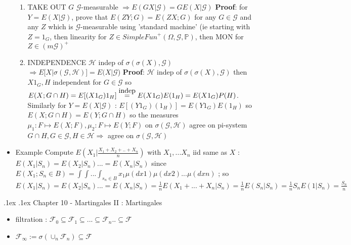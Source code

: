 \documentclass[10pt,landscape,a4paper]{article}
\makeatletter
\renewcommand{\section}{\@startsection{section}{1}{0mm}%
                                {.1ex}%
                                {.1ex}%
                                {\color{blue}\sffamily\small\bfseries}}
\newcommand\myeq[1]{\stackrel{{\normalfont\mbox{#1}}}{ = }}
\makeatother
\begin{document}
\begin{multicols*}{3}
\begin{spacing}{0.5}
\begin{itemize}
\begin{enumerate}
\item \colorbox{green!10}{TAKE OUT $G$ $\mathcal{G}$-measurable $\Rightarrow E(GX|\mathcal{G})=GE(X|\mathcal{G})$} \textbf{Proof}: for $Y=E(X|\mathcal{G})$, prove that $E(ZY;G)=E(ZX;G)$ for any $G \in \mathcal{G}$ and any $Z$ which is $\mathcal{G}$-measurable using 'standard machine' (ie starting with $Z={1}_G$, then linearity  for $Z \in {SimpleFun}^+(\Omega,\mathcal{G},\mathbb{P})$, then MON for $Z \in {(m\mathcal{G})}^+ $
	
\item \colorbox{green!10}{INDEPENDENCE $ \mathcal{H}$ indep of $\sigma(\sigma(X),\mathcal{G})$} \\ \colorbox{green!10}{ $\Rightarrow E[X|\sigma(\mathcal{G},\mathcal{H})]=E(X|\mathcal{G}$) } \textbf{Proof}: $ \mathcal{H}$ indep of $\sigma(\sigma(X),\mathcal{G})$ then $X1_G,H$ independent for $G \in \mathcal{G}$ so $E(X;G \cap H)=E[(X1_G)1_H] \myeq{indep} E(X1_G)E(1_H)=E(X1_G)P(H)$. Similarly for $Y=E(X|\mathcal{G})$ : $E[(Y1_G)(1_H)]=E(Y1_G)E(1_H)$ so $E(X;G \cap H)=E(Y;G \cap H)$ so the measures $\mu_1: F \mapsto E(X;F), \mu_2: F \mapsto E(Y;F)$ on $\sigma(\mathcal{G},\mathcal{H})$ agree on pi-system $G \cap H, G\in \mathcal{G}, H \in \mathcal{H} \Rightarrow$ agree  on $\sigma(\mathcal{G},\mathcal{H})$

\end{enumerate}

\item \colorbox{green!10}{Example} Compute $E(X_1| \frac{X_1+X_2+..+X_n}{n})$ with $X_1,...X_n$ iid same as $X$ : $E(X_1|S_n)=E(X_2|S_n)...=E(X_n|S_n)$ since $E(X_1;S_n \in B)=\int \int ... \int_{s_n \in B} x_1 \mu(dx1)\mu(dx2)...\mu(dxn)$ ; so $E(X_1|S_n)=E(X_2|S_n)...=E(X_n|S_n) = \frac{1}{n} E(X_1+...+X_n|S_n)=\frac{1}{n} E(S_n|S_n)=\frac{1}{n} S_n E(1|S_n)=\frac{S_n}{n}$

\end{itemize}

\section{Chapter 10 - Martingales II : Martingales }

\begin{itemize}

\item filtration : $\mathcal{F}_0 \subseteq \mathcal{F}_1 \subseteq ... \subseteq \mathcal{F}_n .. \subseteq \mathcal{F} $

\item  $\mathcal{F}_{\infty} := \sigma(\cup_n \mathcal{F}_n ) \subseteq \mathcal{F} $


\end{itemize}
\end{spacing}
\end{multicols*}
\end{document}
